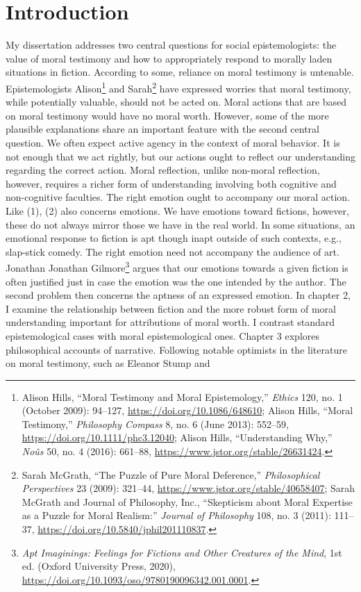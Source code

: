 \documentclass[phdthesis,12pt,final]{wuthesis}
\theoremstyle{definition}
\theoremstyle{definition}
\theoremstyle{definition}
\theoremstyle{definition}
\theoremstyle{remark}
\begin{document}
\cleardoublepage
{}
\setcounter{page}{1}

\listoffigures

\chapter{Introduction}\label{introduction}

My dissertation addresses two central questions for social epistemologists: the value of moral testimony and how to appropriately respond to morally laden situations in fiction. According to some, reliance on moral testimony is untenable. Epistemologists Alison\footnote{Alison Hills, {``Moral Testimony and Moral Epistemology,''} \emph{Ethics} 120, no. 1 (October 2009): 94--127, \url{https://doi.org/10.1086/648610}; Alison Hills, {``Moral {Testimony},''} \emph{Philosophy Compass} 8, no. 6 (June 2013): 552--59, \url{https://doi.org/10.1111/phc3.12040}; Alison Hills, {``Understanding {Why},''} \emph{Noûs} 50, no. 4 (2016): 661--88, \url{https://www.jstor.org/stable/26631424}.} and Sarah\footnote{Sarah McGrath, {``The {Puzzle} of {Pure Moral Deference},''} \emph{Philosophical Perspectives} 23 (2009): 321--44, \url{https://www.jstor.org/stable/40658407}; Sarah McGrath and Journal of Philosophy, Inc., {``Skepticism about {Moral Expertise} as a {Puzzle} for {Moral Realism}:''} \emph{Journal of Philosophy} 108, no. 3 (2011): 111--37, \url{https://doi.org/10.5840/jphil201110837}.} have expressed worries that moral testimony, while potentially valuable, should not be acted on. Moral actions that are based on moral testimony would have no moral worth. However, some of the more plausible explanations share an important feature with the second central question. We often expect active agency in the context of moral behavior. It is not enough that we act rightly, but our actions ought to reflect our understanding regarding the correct action. Moral reflection, unlike non-moral reflection, however, requires a richer form of understanding involving both cognitive and non-cognitive faculties. The right emotion ought to accompany our moral action. Like (1), (2) also concerns emotions. We have emotions toward fictions, however, these do not always mirror those we have in the real world. In some situations, an emotional response to fiction is apt though inapt outside of such contexts, e.g., slap-stick comedy. The right emotion need not accompany the audience of art. Jonathan Jonathan Gilmore\footnote{\emph{Apt {Imaginings}: {Feelings} for {Fictions} and {Other Creatures} of the {Mind}}, 1st ed. (Oxford University Press, 2020), \url{https://doi.org/10.1093/oso/9780190096342.001.0001}.} argues that our emotions towards a given fiction is often justified just in case the emotion was the one intended by the author. The second problem then concerns the aptness of an expressed emotion. In chapter 2, I examine the relationship between fiction and the more robust form of moral understanding important for attributions of moral worth. I contrast standard epistemological cases with moral epistemological ones. Chapter 3 explores philosophical accounts of narrative. Following notable optimists in the literature on moral testimony, such as Eleanor Stump and 
\end{document}
